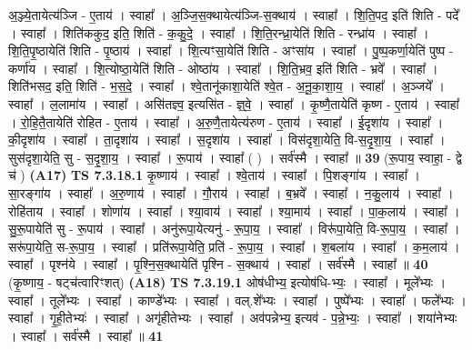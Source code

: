 \documentclass[17pt]{extarticle}
\begin{document}
                  अ॒ञ्ज्ये॒तायेत्य॑ञ्जि - ए॒ताय॑ । स्वाहा᳚ । अ॒ञ्जि॒स॒क्थायेत्य॑ञ्जि-स॒क्थाय॑ । स्वाहा᳚ । शि॒ति॒पद॒ इति॑ शिति - पदे᳚ । स्वाहा᳚ । शिति॑ककुद॒ इति॒ शिति॑ - क॒कु॒दे॒ । स्वाहा᳚ । शि॒ति॒रन्ध्रा॒येति॑ शिति - रन्ध्रा॑य । स्वाहा᳚ । शि॒ति॒पृ॒ष्ठायेति॑ शिति - पृ॒ष्ठाय॑ । स्वाहा᳚ । शि॒त्यꣳसा॒येति॑ शिति - अꣳसा॑य । स्वाहा᳚ । पु॒ष्प॒कर्णा॒येति॑ पुष्प - कर्णा॑य । स्वाहा᳚ । शि॒त्योष्ठा॒येति॑ शिति - ओष्ठा॑य । स्वाहा᳚ । शि॒ति॒भ्रव॒ इति॑ शिति - भ्रवे᳚ । स्वाहा᳚ । शिति॑भसद॒ इति॒ शिति॑ - भ॒स॒दे॒ । स्वाहा᳚ । श्वे॒तानू॑काशा॒येति॑ श्वे॒त - अ॒नू॒का॒शा॒य॒ । स्वाहा᳚ । अ॒ञ्जये᳚ । स्वाहा᳚ । ल॒लामा॑य । स्वाहा᳚ । असि॑तज्ञ्व॒ इत्यसि॑त - ज्ञ्॒वे॒ । स्वाहा᳚ । कृ॒ष्णै॒तायेति॑ कृष्ण - ए॒ताय॑ । स्वाहा᳚ । रो॒हि॒तै॒तायेति॑ रोहित - ए॒ताय॑ । स्वाहा᳚ । अ॒रु॒णै॒तायेत्य॑रुण - ए॒ताय॑ । स्वाहा᳚ । ई॒दृशा॑य । स्वाहा᳚ । की॒दृशा॑य । स्वाहा᳚ । ता॒दृशा॑य । स्वाहा᳚ । स॒दृशा॑य । स्वाहा᳚ । विस॑दृशा॒येति॒ वि-स॒दृ॒शा॒य॒ । स्वाहा᳚ । सुस॑दृशा॒येति॒ सु - स॒दृ॒शा॒य॒ । स्वाहा᳚ । रू॒पाय॑ । स्वाहा᳚ ( ) । सर्व॑स्मै । स्वाहा᳚ ॥ \textbf{  39} \newline
                  \newline
                      (रू॒पाय॒ स्वाहा॒ - द्वे च॑ )  \textbf{(A17)} \newline \newline
                                \textbf{ TS 7.3.18.1} \newline
                  कृ॒ष्णाय॑ । स्वाहा᳚ । श्वे॒ताय॑ । स्वाहा᳚ । पि॒शङ्गा॑य । स्वाहा᳚ । सा॒रङ्गा॑य । स्वाहा᳚ । अ॒रु॒णाय॑ । स्वाहा᳚ । गौ॒राय॑ । स्वाहा᳚ । ब॒भ्रवे᳚ । स्वाहा᳚ । न॒कु॒लाय॑ । स्वाहा᳚ । रोहि॑ताय । स्वाहा᳚ । शोणा॑य । स्वाहा᳚ । श्या॒वाय॑ । स्वाहा᳚ । श्या॒माय॑ । स्वाहा᳚ । पा॒क॒लाय॑ । स्वाहा᳚ । सु॒रू॒पायेति॑ सु - रू॒पाय॑ । स्वाहा᳚ । अनु॑रूपा॒येत्यनु॑ - रू॒पा॒य॒ । स्वाहा᳚ । विरू॑पा॒येति॒ वि-रू॒पा॒य॒ । स्वाहा᳚ । सरू॑पा॒येति॒ स-रू॒पा॒य॒ । स्वाहा᳚ । प्रति॑रूपा॒येति॒ प्रति॑ - रू॒पा॒य॒ । स्वाहा᳚ । श॒बला॑य । स्वाहा᳚ । क॒म॒लाय॑ । स्वाहा᳚ । पृश्न॑ये । स्वाहा᳚ । पृ॒श्नि॒स॒क्थायेति॑ पृश्नि - स॒क्थाय॑ । स्वाहा᳚ । सर्व॑स्मै । स्वाहा᳚ ॥ \textbf{  40} \newline
                  \newline
                      (कृ॒ष्णाय॒ - षट्च॑त्वारिꣳशत्)  \textbf{(A18)} \newline \newline
                                \textbf{ TS 7.3.19.1} \newline
                  ओष॑धीभ्य॒ इत्योष॑धि-भ्यः॒ । स्वाहा᳚ । मूले᳚भ्यः । स्वाहा᳚ । तूले᳚भ्यः । स्वाहा᳚ । काण्डे᳚भ्यः । स्वाहा᳚ । वल्.शे᳚भ्यः । स्वाहा᳚ । पुष्पे᳚भ्यः । स्वाहा᳚ । फले᳚भ्यः । स्वाहा᳚ । गृ॒ही॒तेभ्यः॑ । स्वाहा᳚ । अगृ॑हीतेभ्यः । स्वाहा᳚ । अव॑पन्नेभ्य॒ इत्यव॑ - प॒न्ने॒भ्यः॒ । स्वाहा᳚ । शया॑नेभ्यः । स्वाहा᳚ । सर्व॑स्मै । स्वाहा᳚ ॥ \textbf{  41 } \newline
\end{document}

